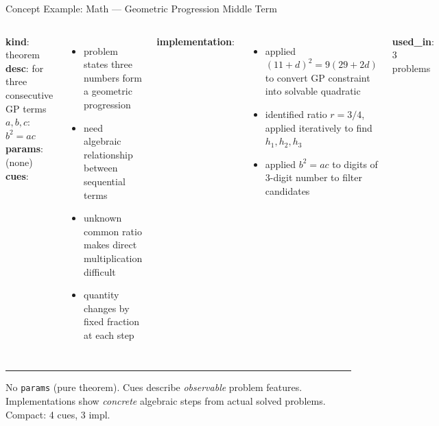 \documentclass[10pt]{beamer}
\begin{document}
\begin{frame}{Concept Example: \textcolor{mathgreen}{Math} --- Geometric Progression Middle Term}
  \begin{columns}[T]
    {\scriptsize
    \textbf{kind}: theorem\\
    \textbf{desc}: for three consecutive GP terms $a, b, c$: $b^2 = ac$\\
    \textbf{params}: (none)\\[0.3em]
    \textbf{cues}:
    \begin{itemize}\setlength\itemsep{0pt}
      \item problem states three numbers form a geometric progression
      \item need algebraic relationship between sequential terms
      \item unknown common ratio makes direct multiplication difficult
      \item quantity changes by fixed fraction at each step
    \end{itemize}
    }

    {\scriptsize
    \textbf{implementation}:
    \begin{itemize}\setlength\itemsep{0pt}
      \item applied $(11{+}d)^2 = 9(29{+}2d)$ to convert GP constraint into solvable quadratic
      \item identified ratio $r{=}3/4$, applied iteratively to find $h_1, h_2, h_3$
      \item applied $b^2 = ac$ to digits of 3-digit number to filter candidates
    \end{itemize}
    \vspace{0.3em}
    \textbf{used\_in}: 3 problems
    }
  \end{columns}

  \vspace{0.7em}
  \hrule
  \vspace{0.3em}
  {\footnotesize No \texttt{params} (pure theorem). Cues describe \emph{observable} problem features. Implementations show \emph{concrete} algebraic steps from actual solved problems. Compact: 4 cues, 3 impl.}
\end{frame}
\end{document}

